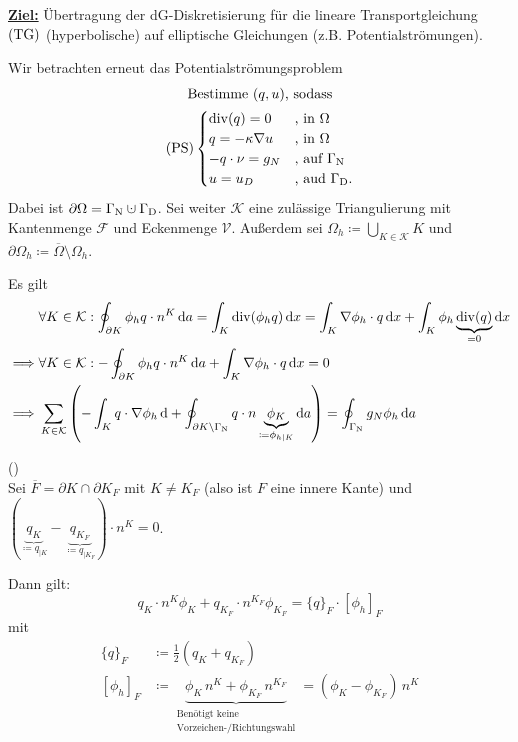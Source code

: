
\underline{\textbf{Ziel:}} Übertragung der dG-Diskretisierung für die lineare Transportgleichung $ \operatorname{(TG)} $ (hyperbolische) auf elliptische Gleichungen (z.B. Potentialströmungen).

Wir betrachten erneut das Potentialströmungsproblem
\begin{gather*}
	\text{Bestimme } (q, u) \text{, sodass}\\
	\operatorname{(PS)} \begin{cases}
		\operatorname{div}(q) = 0 &\text{, in }\Omega\\
		q = - \kappa \nabla u &\text{, in } \Omega\\
		-q \cdot \nu = g_N &\text{, auf }\Gamma_{\text{N}}\\
		u = u_D &\text{, aud } \Gamma_{\text{D}}. 
	\end{cases}
\end{gather*}
Dabei ist $ \partial \Omega = \GammaN \cupdot \GammaD $. Sei weiter $ \mathcal{K} $ eine zulässige Triangulierung mit Kantenmenge $ \mathcal{F} $ und Eckenmenge $ \mathcal{V} $. Außerdem sei $ \Omega_h \coloneqq \bigcup_{K \in \mathcal{K}} K$ und $ \partial \Omega_h \coloneqq \overline{\Omega} \setminus \Omega_h $.

Es gilt 
\begin{align*}
	&\forall K \in \mathcal{K}: \oint_{\partial K} \phi_h q \cdot n^K \diff a = \int_K \dive(\phi_h q) \diff x = \int_K \nabla\phi_h \cdot q \diff x + \int_K \phi_h \underbrace{\dive(q)}_{=0} \diff x\\
	\implies &\forall K \in \mathcal{K}: -\oint_{\partial K} \phi_h q \cdot n^K \diff a + \int_K \nabla\phi_h \cdot q \diff x  = 0 \\
	\implies &\sum_{K \in \mathcal{K}} \left( - \int_K q \cdot \nabla \phi_h \diff + \oint_{\partial K \setminus \GammaN} q \cdot n \underbrace{\phi_K}_{\coloneqq \phi_{h|K}} \diff a  \right) = \oint_{\GammaN} g_N \phi_h \diff a
\end{align*}

\begin{Satz}()\\
	Sei $ \overline{F} = \partial K \cap \partial K_F $ mit $ K \ne K_F $ (also ist $ F $ eine innere Kante) und $ ( \underbrace{q_{K} }_{\coloneqq q_{|K}}- \underbrace{q_{K_F}}_{\coloneqq q_{|K_F}} )  \cdot n^K = 0$.
	
	Dann gilt:
	\[ q_K \cdot n^K \phi_K + q_{K_F} \cdot n^{K_F} \phi_{K_F} = \{q\}_F \cdot [\phi_h]_F \]
	mit
	\begin{align*}
		\{q\}_F &\coloneqq \frac{1}{2} (q_K + q_{K_F})\\
		[\phi_h]_F &\coloneqq \underbrace{\phi_K \, n^K + \phi_{K_F} \, n^{K_F}}_{\substack{\text{Benötigt keine}\\ \text{Vorzeichen-/Richtungswahl}}} = (\phi_K - \phi_{K_F}) \, n^K
	\end{align*}
\end{Satz}


